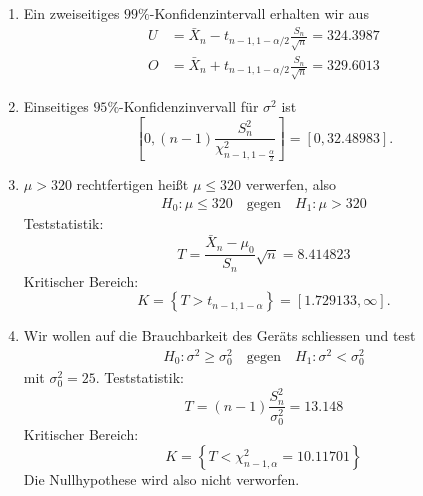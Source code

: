 \solution
\begin{enumerate}
    \item Ein zweiseitiges $99\%$-Konfidenzintervall erhalten wir aus
        \begin{align*}
            U &= \bar X_n - t_{n-1, 1-\alpha/2}\frac{S_n}{\sqrt{n}} = 324.3987 \\
            O &= \bar X_n + t_{n-1, 1-\alpha/2}\frac{S_n}{\sqrt{n}} = 329.6013
        \end{align*}

    \item Einseitiges $95\%$-Konfidenzinvervall für $\sigma^2$ ist 
        \begin{equation*}
            \left[ 0, (n-1)\frac{S^2_n}{ \chi^{2}_{n-1, 1 - \frac{\alpha}{2}} } \right] = \left[ 0, 32.48983 \right].
        \end{equation*}

    \item $\mu>320$ rechtfertigen heißt $\mu\leq 320$ verwerfen, also
        \begin{align*}
            H_0: \mu \leq 320 \quad\text{gegen}\quad H_1 : \mu > 320
        \end{align*}
        Teststatistik:
        \begin{equation*}
            T = \frac{\bar X_n - \mu_0}{S_n} \sqrt{n} = 8.414823
        \end{equation*}
        Kritischer Bereich:
        \begin{equation*}
            K = \left\{ T > t_{n-1, 1-\alpha} \right\} = [ 1.729133, \infty].
        \end{equation*}

    \item Wir wollen auf die Brauchbarkeit des Geräts schliessen und test
        \begin{align*}
            H_0 : \sigma^2 \geq \sigma^{2}_{0} \quad\text{gegen}\quad H_1 : \sigma^2 < \sigma^2_0
        \end{align*}
        mit $\sigma^{2}_{0} = 25$. Teststatistik:
        \begin{equation*}
            T = (n-1)\frac{S^{2}_{n}}{\sigma^{2}_{0}} = 13.148
        \end{equation*}
        Kritischer Bereich:
        \begin{equation*}
            K = \left\{ T < \chi^{2}_{n-1, \alpha} = 10.11701 \right\}
        \end{equation*}
        Die Nullhypothese wird also nicht verworfen. 
\end{enumerate}

